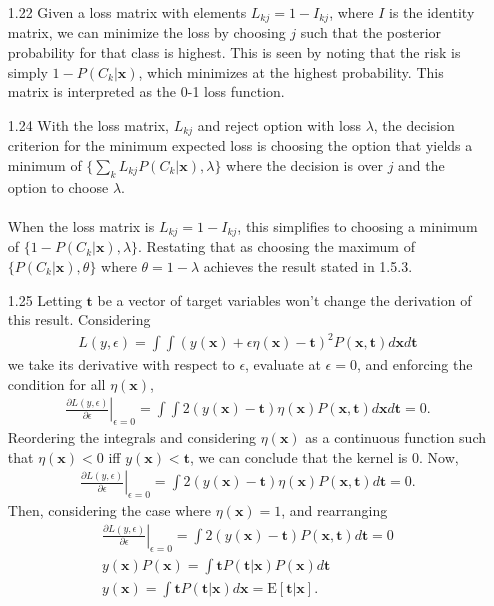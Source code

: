 \documentclass[]{article}
\begin{document}
\begin{enumerate}
 	\item[1.22] Given a loss matrix with elements $L_{kj} = 1 - I_{kj}$, where $I$ is the identity matrix, we can minimize the loss by choosing $j$ such that the posterior probability for that class is highest. This is seen by noting that the risk is simply $1 - P(C_k | \mathbf{x})$, which minimizes at the highest probability. This matrix is interpreted as the 0-1 loss function.
 	
 	\item[1.24] With the loss matrix, $L_{kj}$ and reject option with loss $\lambda$, the decision criterion for the minimum expected loss is choosing the option that yields a minimum of $\{\sum_{k} L_{kj} P(C_k|\mathbf{x}), \lambda\}$ where the decision is over $j$ and the option to choose $\lambda$. \\ \\
 	When the loss matrix is $L_{kj} = 1 - I_{kj}$, this simplifies to choosing a minimum of $\{1-P(C_k|\mathbf{x}), \lambda\}$. Restating that as choosing the maximum of $\{P(C_k|\mathbf{x}), \theta\}$ where $\theta = 1 - \lambda$ achieves the result stated in 1.5.3. 
 	
 	\item[1.25] Letting $\mathbf{t}$ be a vector of target variables won't change the derivation of this result. Considering 
 	\begin{align*}
 	L(y,\epsilon)= \int \int (y(\mathbf{x})+\epsilon \eta(\mathbf{x}) - \mathbf{t})^2P(\mathbf{x},\mathbf{t})d\mathbf{x} d\mathbf{t}
 	\end{align*}
 	we take its derivative with respect to $\epsilon$, evaluate at $\epsilon=0$, and enforcing the condition for all $\eta(\mathbf{x})$,
 	\begin{align*}
 	\left. \frac{\partial L(y, \epsilon)}{\partial \epsilon}\right|_{\epsilon=0}=\int \int 2(y(\mathbf{x})-\mathbf{t})\eta(\mathbf{x})P(\mathbf{x},\mathbf{t})d\mathbf{x}d\mathbf{t}=0.
 	\end{align*}
 	Reordering the integrals and considering $\eta(\mathbf{x})$ as a continuous function such that $\eta(\mathbf{x})<0$ iff $y(\mathbf{x})<\mathbf{t}$, we can conclude that the kernel is 0. Now,
 	\begin{align*}
 	\left. \frac{\partial L(y, \epsilon)}{\partial \epsilon}\right|_{\epsilon=0}= \int 2(y(\mathbf{x})-\mathbf{t})\eta(\mathbf{x})P(\mathbf{x},\mathbf{t})d\mathbf{t}=0.
 	\end{align*}
 	Then, considering the case where $\eta(\mathbf{x})=1$, and rearranging
 	\begin{align*}
	\left. \frac{\partial L(y, \epsilon)}{\partial \epsilon}\right|_{\epsilon=0}= \int 2(y(\mathbf{x})-\mathbf{t})P(\mathbf{x},\mathbf{t})d\mathbf{t}=0 \\
	y(\mathbf{x})P(\mathbf{x})=\int \mathbf{t} P(\mathbf{t}|\mathbf{x})P(\mathbf{x})d\mathbf{t} \\
	y(\mathbf{x})=\int \mathbf{t}P(\mathbf{t}|\mathbf{x})d\mathbf{x} = \text{E}[\mathbf{t}|\mathbf{x}].
	\end{align*}
  	

\end{enumerate}
\end{document}
